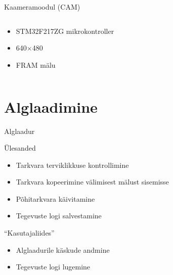 \documentclass[pdf]{beamer}
\begin{document}
\begin{frame}{Kaameramoodul (CAM)}
	\begin{columns}
		\begin{column}{0.5\textwidth}
			\begin{itemize}
				\item STM32F217ZG mikrokontroller
				\item 640\(\times\)480 
				\item FRAM mälu
			\end{itemize}
		\end{column}
		\begin{column}{0.5\textwidth}
		\end{column}
	\end{columns}
\end{frame}

\section{Alglaadimine}
\begin{frame}{Alglaadur}
	\begin{block}{Ülesanded}
		\begin{itemize}
			\item Tarkvara terviklikkuse kontrollimine
			\item Tarkvara kopeerimine välimisest mälust sisemisse
			\item Põhitarkvara käivitamine
			\item Tegevuste logi salvestamine
		\end{itemize}
	\end{block}
	\begin{block}{``Kasutajaliides''}
		\begin{itemize}
			\item Alglaadurile käskude andmine
			\item Tegevuste logi lugemine
		\end{itemize}
	\end{block}
\end{frame}
\end{document}
